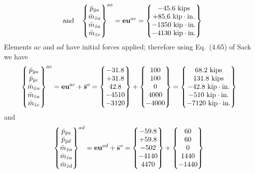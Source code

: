 \begin{enumerate}[leftmargin=*]
\begin{example}
\begin{solution}
\begin{equation*}
      \quad\text{and}\quad
      \begin{Bmatrix}\bar p_{\bar ya}\\ \bar m_{\bar xa}\\ \bar m_{\bar za}\\ \bar m_{\bar ze}\end{Bmatrix}^{ae} = \mathbf{e}\mathbf{u}^{ae} = \begin{Bmatrix}-45.6\text{ kips}\\ +85.6\text{ kip}\cdot\text{in.}\\ -1350\text{ kip}\cdot\text{in.}\\ -4130\text{ kip}\cdot\text{in.}\end{Bmatrix}
    \end{equation*}
    Elements $ac$ and $ad$ have initial forces applied; therefore using Eq.~(4.65) of Sack we have
    \begin{equation*}
      \begin{Bmatrix}\bar p_{\bar ya}\\ \bar p_{\bar yc}\\ \bar m_{\bar xa}\\ \bar m_{\bar za}\\ \bar m_{\bar zc}\end{Bmatrix}^{ac} = \mathbf{e}\mathbf{u}^{ac}+\bar{\mathbf{s}}^o
      = \begin{Bmatrix}-31.8\\ +31.8\\ 42.8\\ -4510\\ -3120\end{Bmatrix} + \begin{Bmatrix}100\\ 100\\ 0\\ 4000\\ -4000\end{Bmatrix}
      = \begin{Bmatrix}68.2\text{ kips}\\ 131.8\text{ kips}\\ -42.8\text{ kip}\cdot\text{in.}\\ -510\text{ kip}\cdot\text{in.}\\ -7120\text{ kip}\cdot\text{in.}\end{Bmatrix}
    \end{equation*}
    and
    \begin{equation*}
      \Bmat{\bar p_{\bar ya}\\ \bar p_{\bar yd}\\ \bar m_{\bar xa}\\ \bar m_{\bar za}\\ \bar m_{\bar zd}}^{ad} = \mat{e}\mat{u}^{ad}+\bar{\mat{s}}^o
      = \Bmat{-59.8\\ +59.8\\ -502\\ -4140\\ 4470} + \Bmat{60\\ 60\\ 0\\ 1440\\ -1440}

\end{equation*}
\end{solution}
\end{example}
\end{enumerate}

